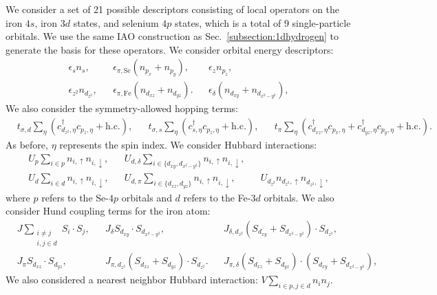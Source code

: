 We consider a set of 21 possible descriptors consisting of local operators on the iron $4s$, iron $3d$ states, and selenium $4p$ states, which is a total of 9 single-particle orbitals.
We use the same IAO construction as Sec.~\ref{subsection:1dhydrogen} to generate the basis for these operators.
We consider orbital energy descriptors: 
\begin{align}
  &\epsilon_{s} n_s,&
  &\epsilon_{\pi,\mathrm{Se}} (n_{p_x} + n_{p_y}), &
  &\epsilon_{z} n_{p_z},&
  \\
  &\epsilon_{z^2} n_{d_{z^2}},& 
  &\epsilon_{\pi,\mathrm{Fe}} (n_{d_{xz}} + n_{d_{yz}}).& 
  &\epsilon_{\delta} (n_{d_{xy}} + n_{d_{x^2-y^2}}),&
\end{align}
We also consider the symmetry-allowed hopping terms:
\begin{align}
  &t_{\sigma,d} \sum_{\eta} \left( c_{d_{z^2},\eta}^{\dagger} c_{p_z,\eta} + \text{h.c.} \right),&
  &t_{\sigma,s} \sum_{\eta} \left(c_{s,\eta}^{\dagger}  c_{p_z,\eta} + \text{h.c.} \right),&
  &t_{\pi} \sum_{\eta} \left(c_{d_{xz},\eta}^{\dagger}  c_{p_x,\eta} + c_{d_{yz},\eta}^{\dagger}  c_{p_y,\eta} + \text{h.c.} \right).&
\end{align}
As before, $\eta$ represents the spin index.
We consider Hubbard interactions:
\begin{align}
  &U_p \sum_{i \in p} n_{i,\uparrow} n_{i,\downarrow},&
  &U_{d,\delta} \sum_{i\in \{d_{xy},d_{x^2-y^2}\}} n_{i,\uparrow} n_{i,\downarrow},&
  \\
  &U_d \sum_{i \in d} n_{i,\uparrow} n_{i,\downarrow},&
  &U_{d,\pi} \sum_{i\in \{d_{xz},d_{yz}\}} n_{i,\uparrow} n_{i,\downarrow},&
  &U_{d_{z^2}} n_{d_{z^2},\uparrow} n_{d_{z^2},\downarrow},&
\end{align}
where $p$ refers to the Se-$4p$ orbitals and $d$ refers to the Fe-$3d$ orbitals. 
We also consider Hund coupling terms for the iron atom:
\begin{align}
  &J \sum_{\substack{i\ne j \\i,j \in d}} S_i \cdot S_j,&
  &J_{\delta} S_{d_{xy}} \cdot S_{d_{x^2-y^2}},&
  &J_{\delta,d_{z^2}} (S_{d_{xy}} + S_{d_{x^2-y^2}}) \cdot S_{d_{z^2}},& \label{eqn:hund1}
  \\
  &J_{\pi} S_{d_{xz}} \cdot S_{d_{yz}},&
  &J_{\pi,d_{z^2}} (S_{d_{xz}} + S_{d_{yz}}) \cdot S_{d_{z^2}}.&
  &J_{\pi,\delta} (S_{d_{xz}} + S_{d_{yz}}) \cdot (S_{d_{xy}} + S_{d_{x^2-y^2}}),&
\end{align}
We also considered a nearest neighbor Hubbard interaction: $V \sum_{i\in p, j\in d} n_{i} n_j$.

